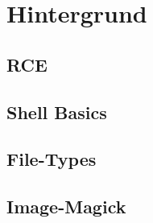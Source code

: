 \chapter{Hintergrund}\label{ch:hintergrund}

\section{RCE}\label{sec:rce}

\section{Shell Basics}\label{sec:shell-basics}

\section{File-Types}\label{sec:file-types}

\section{Image-Magick}\label{sec:image-magick}

